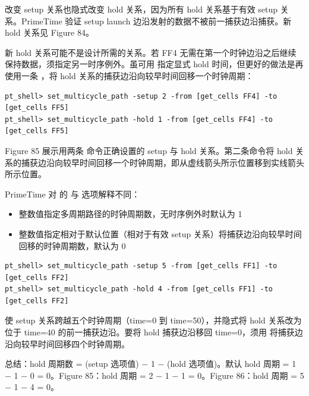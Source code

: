 改变 setup 关系也隐式改变 hold 关系，因为所有 hold 关系基于有效 setup 关系。PrimeTime 验证 setup launch 边沿发射的数据不被前一捕获边沿捕获。新 hold 关系见 Figure 84。


新 hold 关系可能不是设计所需的关系。若 FF4 无需在第一个时钟边沿之后继续保持数据，须指定另一时序例外。虽可用  指定显式 hold 时间，但更好的做法是再使用一条 ，将 hold 关系的捕获边沿向较早时间回移一个时钟周期：

\begin{lstlisting}
pt_shell> set_multicycle_path -setup 2 -from [get_cells FF4] -to [get_cells FF5]
pt_shell> set_multicycle_path -hold 1 -from [get_cells FF4] -to [get_cells FF5]
\end{lstlisting}

Figure 85 展示用两条  命令正确设置的 setup 与 hold 关系。第二条命令将 hold 关系的捕获边沿向较早时间回移一个时钟周期，即从虚线箭头所示位置移到实线箭头所示位置。


PrimeTime 对  的  与  选项解释不同：
\begin{itemize}
  \item {} 整数值指定多周期路径的时钟周期数，无时序例外时默认为 1
  \item {} 整数值指定相对于默认位置（相对于有效 setup 关系）将捕获边沿向较早时间回移的时钟周期数，默认为 0
\end{itemize}


\begin{lstlisting}
pt_shell> set_multicycle_path -setup 5 -from [get_cells FF1] -to [get_cells FF2]
pt_shell> set_multicycle_path -hold 4 -from [get_cells FF1] -to [get_cells FF2]
\end{lstlisting}

 使 setup 关系跨越五个时钟周期（time=0 到 time=50），并隐式将 hold 关系改为位于 time=40 的前一捕获边沿。要将 hold 捕获边沿移回 time=0，须用  将捕获边沿向较早时间回移四个时钟周期。

总结：hold 周期数 = (setup 选项值) $-$ 1 $-$ (hold 选项值)。默认 hold 周期 = 1 $-$ 1 $-$ 0 = 0。Figure 85：hold 周期 = 2 $-$ 1 $-$ 1 = 0。Figure 86：hold 周期 = 5 $-$ 1 $-$ 4 = 0。

